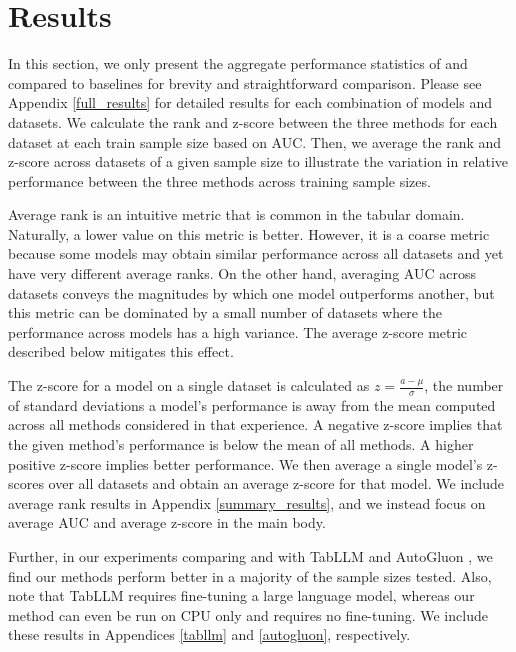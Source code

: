 \section{Results}
\label{results}

In this section, we only present the aggregate performance statistics of \methodname and \methodnamepfn compared to baselines for brevity and straightforward comparison. Please see Appendix \ref{full_results} for detailed results for each combination of models and datasets. We calculate the rank and z-score between the three methods for each dataset at each train sample size based on AUC. Then, we average the rank and z-score across datasets of a given sample size to illustrate the variation in relative performance between the three methods across training sample sizes.

Average rank is an intuitive metric that is common in the tabular domain. Naturally, a lower value on this metric is better. However, it is a coarse metric because some models may obtain similar performance across all datasets and yet have very different average ranks. On the other hand, averaging AUC across datasets conveys the magnitudes by which one model outperforms another, but this metric can be dominated by a small number of datasets where the performance across models has a high variance. The average z-score metric described below mitigates this effect. 

The z-score for a model on a single dataset is calculated as $z = \frac{a-\mu}{\sigma}$, the number of standard deviations a model's performance is away from the mean computed across all methods considered in that experience. A negative z-score implies that the given method's performance is below the mean of all methods. A higher positive z-score implies better performance. We then average a single model's z-scores over all datasets and obtain an average z-score for that model.
We include average rank results in Appendix \ref{summary_results}, and we instead focus on average AUC and average z-score in the main body.

Further, in our experiments comparing \methodname and \methodnamepfn with TabLLM \citep{hegselmann2023tabllm} and AutoGluon \citep{agtabular}, we find our methods perform better in a majority of the sample sizes tested. Also, note that TabLLM requires fine-tuning a large language model, whereas our method can even be run on CPU only and requires no fine-tuning.  We include these results in Appendices \ref{tabllm} and \ref{autogluon}, respectively.

